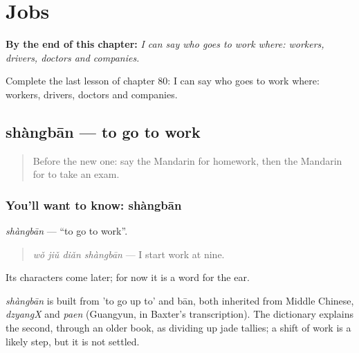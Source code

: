 
\chapter{Jobs}
\label{ch:zh-jobs}

\begin{chapteropening}
\textbf{By the end of this chapter:} \emph{I can say who goes to work where: workers, drivers, doctors and companies.}

Complete the last lesson of chapter 80: I can say who goes to work where: workers, drivers, doctors and companies.
\end{chapteropening}

\section[shàngbān]{shàngbān — to go to work}

\label{lesson:ZH-C80-shangban}



\begin{quote}
Before the new one: say the Mandarin for homework, then the Mandarin for to take an exam.
\end{quote}

\subsection*{You'll want to know: shàngbān}
\emph{shàngbān} — \textquotedblleft{}to go to work\textquotedblright{}.

\begin{quote}
\emph{wǒ jiǔ diǎn shàngbān} — I start work at nine.
\end{quote}

Its characters come later; for now it is a word for the ear.

\begin{cousinweb}
\emph{shàngbān} is built from  'to go up to' and bān, both inherited from Middle Chinese, \emph{dzyangX} and \emph{paen} (Guangyun, in Baxter's transcription). The dictionary explains the second, through an older book, as dividing up jade tallies; a shift of work is a likely step, but it is not settled.
\end{cousinweb}

